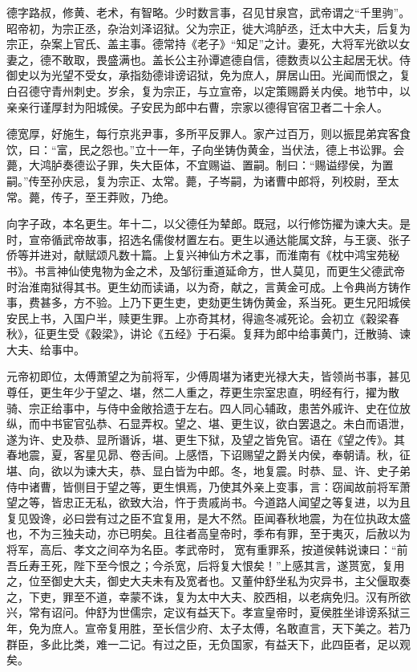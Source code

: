 \documentclass[12pt,UTF8]{ctexbook}
\begin{document}
德字路叔，修黄、老术，有智略。少时数言事，召见甘泉宫，武帝谓之“千里驹”。昭帝初，为宗正丞，杂治刘泽诏狱。父为宗正，徙大鸿胪丞，迁太中大夫，后复为宗正，杂案上官氏、盖主事。德常持《老子》“知足”之计。妻死，大将军光欲以女妻之，德不敢取，畏盛满也。盖长公主孙谭遮德自信，德数责以公主起居无状。侍御史以为光望不受女，承指劾德诽谤诏狱，免为庶人，屏居山田。光闻而恨之，复白召德守青州刺史。岁余，复为宗正，与立宣帝，以定策赐爵关内侯。地节中，以亲亲行谨厚封为阳城侯。子安民为郎中右曹，宗家以德得官宿卫者二十余人。



德宽厚，好施生，每行京兆尹事，多所平反罪人。家产过百万，则以振昆弟宾客食饮，曰：“富，民之怨也。”立十一年，子向坐铸伪黄金，当伏法，德上书讼罪。会薨，大鸿胪奏德讼子罪，失大臣体，不宜赐谥、置嗣。制曰：“赐谥缪侯，为置嗣。”传至孙庆忌，复为宗正、太常。薨，子岑嗣，为诸曹中郎将，列校尉，至太常。薨，传子，至王莽败，乃绝。



向字子政，本名更生。年十二，以父德任为辇郎。既冠，以行修饬擢为谏大夫。是时，宣帝循武帝故事，招选名儒俊材置左右。更生以通达能属文辞，与王褒、张子侨等并进对，献赋颂凡数十篇。上复兴神仙方术之事，而淮南有《枕中鸿宝苑秘书》。书言神仙使鬼物为金之术，及邹衍重道延命方，世人莫见，而更生父德武帝时治淮南狱得其书。更生幼而读诵，以为奇，献之，言黄金可成。上令典尚方铸作事，费甚多，方不验。上乃下更生吏，吏劾更生铸伪黄金，系当死。更生兄阳城侯安民上书，入国户半，赎更生罪。上亦奇其材，得逾冬减死论。会初立《穀梁春秋》，征更生受《穀梁》，讲论《五经》于石渠。复拜为郎中给事黄门，迁散骑、谏大夫、给事中。



元帝初即位，太傅萧望之为前将军，少傅周堪为诸吏光禄大夫，皆领尚书事，甚见尊任，更生年少于望之、堪，然二人重之，荐更生宗室忠直，明经有行，擢为散骑、宗正给事中，与侍中金敞拾遗于左右。四人同心辅政，患苦外戚许、史在位放纵，而中书宦官弘恭、石显弄权。望之、堪、更生议，欲白罢退之。未白而语泄，遂为许、史及恭、显所谮诉，堪、更生下狱，及望之皆免官。语在《望之传》。其春地震，夏，客星见昴、卷舌间。上感悟，下诏赐望之爵关内侯，奉朝请。秋，征堪、向，欲以为谏大夫，恭、显白皆为中郎。冬，地复震。时恭、显、许、史子弟侍中诸曹，皆侧目于望之等，更生惧焉，乃使其外亲上变事，言：窃闻故前将军萧望之等，皆忠正无私，欲致大治，忤于贵戚尚书。今道路人闻望之等复进，以为且复见毁谗，必曰尝有过之臣不宜复用，是大不然。臣闻春秋地震，为在位执政太盛也，不为三独夫动，亦已明矣。且往者高皇帝时，季布有罪，至于夷灭，后赦以为将军，高后、孝文之间卒为名臣。孝武帝时，宽有重罪系，按道侯韩说谏曰：“前吾丘寿王死，陛下至今恨之；今杀宽，后将复大恨矣！”上感其言，遂贳宽，复用之，位至御史大夫，御史大夫未有及宽者也。又董仲舒坐私为灾异书，主父偃取奏之，下吏，罪至不道，幸蒙不诛，复为太中大夫、胶西相，以老病免归。汉有所欲兴，常有诏问。仲舒为世儒宗，定议有益天下。孝宣皇帝时，夏侯胜坐诽谤系狱三年，免为庶人。宣帝复用胜，至长信少府、太子太傅，名敢直言，天下美之。若乃群臣，多此比类，难一二记。有过之臣，无负国家，有益天下，此四臣者，足以观矣。
\end{document}
